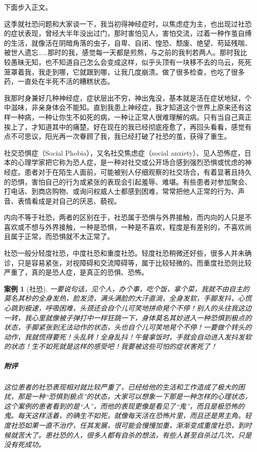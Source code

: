 \documentclass{ctexart}
\newtheorem{case}{案例}
\begin{document}
下面步入正文。

这季就社恐问题和大家谈一下，我当初得神经症时，以焦虑症为主，也出现过社恐的症状表现，曾经大半年没出过门，那时害怕见人，害怕交流，过着一种作茧自缚的生活，就像活在阴暗角落的虫子，自卑、自闭、惶恐、颓废、绝望、苟延残喘、被世人遗忘……那时的我，感觉每一天都是煎熬，与之前的我判若两人。那时我比较愚昧无知，也不知道自己怎么会变成这样，似乎头顶有一块移不去的乌云，死死笼罩着我，我走到哪，它就跟到哪，让我几度崩溃。做了很多检查，也吃了很多药，一直处在半死不活的糟糕状态。

我那时身兼好几种神经症，症状层出不穷，神出鬼没，基本就是活在症状地狱，个中滋味，非亲身体会不能知。直到我患上神经症，我才知道这个世界上原来还有这样一种病，一种让你生不如死的病，一种让正常人很难理解的病。只有当自己真正挨上了，才知道其中的痛楚。好在现在的我已经彻底痊愈了，再回头看看，感觉有点不可思议，阳光再一次眷顾了我，我已经打破了社恐的茧，获得了重生。

社交恐惧症（Social Phobia），又名社交焦虑症（social anxiety）、见人恐怖症，日本的心理学家把它称为恐人症，是一种对社交或公开场合感到强烈恐惧或忧虑的神经症。患者对于在陌生人面前，可能被别人仔细观察的社交场合，有着显著且持久的恐惧，害怕自己的行为或紧张的表现会引起羞辱、难堪。有些患者对参加聚会、打电话、到商店购物、或询问权威人士都感到困难，常常把他人正常的行为、声音、表情看成是对自己的厌恶、藐视。

内向不等于社恐，两者的区别在于，社恐属于恐惧与外界接触，而内向的人只是不喜欢或不想与外界接触，一种是恐惧，一种是不喜欢，程度是有差别的，不喜欢尚且属于正常，而恐惧就不太正常了。

社恐一般分轻度社恐，中度社恐和重度社恐。轻度社恐稍微还好些，很多人并未确诊，只是容易紧张，对视障碍和交流障碍等，属于比较轻微的。而重度社恐则比较严重了，真的是恐人症，是真正的恐惧、恐怖。

\begin{case}[社恐]
    一要说句话，见个人，办个事，吃个饭，拿个菜，我就不由自主的莫名其秒的全身发热，脸发烫，满头满脸的大汗直淌，全身发软，手脚发抖，心慌心跳到极速，呼吸困难，头颈还会自个儿可笑地拼命晃个不停！别人的头往我这边一转，我心里就像被子弹打中一样狂跳一下，身体莫名其妙进入一种恐惧到极点的状态，手脚紧张到无法动作的状态，头也自个儿可笑地晃个不停！一要做个转头的动作，我就慌得要死！头乱转！全身乱抖！午餐拿饭时，手就会自动进入发抖发软的状态！生不如死就是这样的感受吧！我要被这些可怕的症状害死了！
    \subparagraph{附评} 这位患者的社恐表现相对就比较严重了，已经给他的生活和工作造成了极大的困扰，那是一种“恐惧到极点”的状态，大家可以想象一下那是一种怎样的心理状态，这个案例的患者看到的是“人”，而他的表现更像是看见了“鬼”，而且是极恐怖的鬼。每天这样活着，的确生不如死，就像每天活在恐怖片里，而且还是男主角。轻度社恐如果一直不治疗，任其发展，很可能会慢慢加重，渐渐变成重度社恐，到时候就苦大了。患社恐的人，很多人都有自杀的想法，有些人甚至自杀过几次，只是没有死成功。
\end{case}
\end{document}

